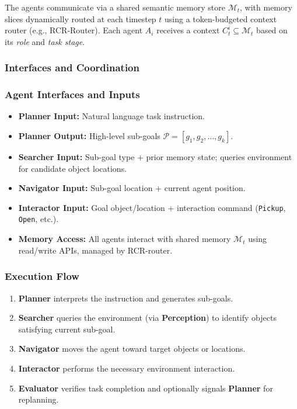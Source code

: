 \vspace{2mm}

\noindent The agents communicate via a shared semantic memory store $\mathcal{M}_t$, with memory slices dynamically routed at each timestep $t$ using a token-budgeted context router (e.g., RCR-Router). Each agent $A_i$ receives a context $C_t^i \subseteq \mathcal{M}_t$ based on its \textit{role} and \textit{task stage}.

\subsubsection*{Interfaces and Coordination}

\subsubsection*{Agent Interfaces and Inputs}

\begin{itemize}
    \item \textbf{Planner Input:} Natural language task instruction.
    \item \textbf{Planner Output:} High-level sub-goals $\mathcal{P} = [g_1, g_2, \dots, g_k]$.
    \item \textbf{Searcher Input:} Sub-goal type + prior memory state; queries environment for candidate object locations.
    \item \textbf{Navigator Input:} Sub-goal location + current agent position.
    \item \textbf{Interactor Input:} Goal object/location + interaction command (\texttt{Pickup}, \texttt{Open}, etc.).
    \item \textbf{Memory Access:} All agents interact with shared memory $\mathcal{M}_t$ using read/write APIs, managed by RCR-router.
\end{itemize}

\subsubsection*{Execution Flow }

\begin{enumerate}
    \item \textbf{Planner} interprets the instruction and generates sub-goals.
    \item \textbf{Searcher} queries the environment (via \textbf{Perception}) to identify objects satisfying current sub-goal.
    \item \textbf{Navigator} moves the agent toward target objects or locations.
    \item \textbf{Interactor} performs the necessary environment interaction.
    \item \textbf{Evaluator} verifies task completion and optionally signals \textbf{Planner} for replanning.
\end{enumerate}

